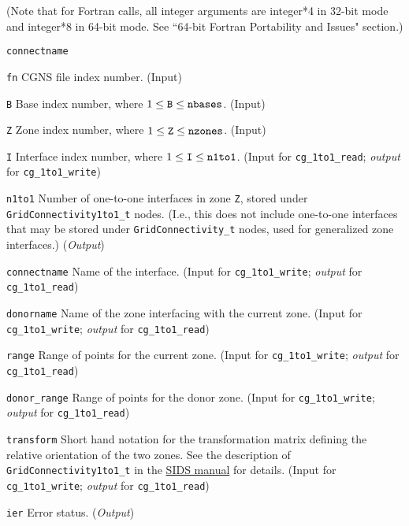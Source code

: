 \noindent (Note that for Fortran calls, all integer arguments are integer*4 in 32-bit mode and integer*8 in 64-bit mode.
See ``64-bit Fortran Portability and Issues" section.)

\begin{Ventryi}{\texttt{connectname}}\raggedright
\item [\texttt{fn}]
      CGNS file index number.
      (\textcolor{input}{Input})
\item [\texttt{B}]
      Base index number, where $1 \leq \text{\texttt{B}} \leq \text{\texttt{nbases}}$.
      (\textcolor{input}{Input})
\item [\texttt{Z}]
      Zone index number, where $1 \leq \text{\texttt{Z}} \leq \text{\texttt{nzones}}$.
      (\textcolor{input}{Input})
\item [\texttt{I}]
      Interface index number, where $1 \leq \text{\texttt{I}} \leq \text{\texttt{n1to1}}$.
      (\textcolor{input}{Input} for \texttt{cg\_1to1\_read};
      \textcolor{output}{\textit{output}} for \texttt{cg\_1to1\_write})
\item [\texttt{n1to1}]
      Number of one-to-one interfaces in zone \texttt{Z}, stored under
      \texttt{GridConnectivity1to1\_t} nodes.
      (I.e., this does not include one-to-one interfaces that may be
      stored under \texttt{GridConnectivity\_t} nodes, used for
      generalized zone interfaces.)
      (\textcolor{output}{\textit{Output}})
\item [\texttt{connectname}]
      Name of the interface.
      (\textcolor{input}{Input} for \texttt{cg\_1to1\_write};
      \textcolor{output}{\textit{output}} for \texttt{cg\_1to1\_read})
\item [\texttt{donorname}]
      Name of the zone interfacing with the current zone.
      (\textcolor{input}{Input} for \texttt{cg\_1to1\_write};
      \textcolor{output}{\textit{output}} for \texttt{cg\_1to1\_read})
\item [\texttt{range}]
      Range of points for the current zone.
      (\textcolor{input}{Input} for \texttt{cg\_1to1\_write};
      \textcolor{output}{\textit{output}} for \texttt{cg\_1to1\_read})
\item [\texttt{donor\_range}]
      Range of points for the donor zone.
      (\textcolor{input}{Input} for \texttt{cg\_1to1\_write};
      \textcolor{output}{\textit{output}} for \texttt{cg\_1to1\_read})
\item [\texttt{transform}]
      Short hand notation for the transformation matrix defining the
      relative orientation of the two zones.
      See the description of \texttt{GridConnectivity1to1\_t} in the
      \href{../sids/sids.pdf}{SIDS manual} for details.
      (\textcolor{input}{Input} for \texttt{cg\_1to1\_write};
      \textcolor{output}{\textit{output}} for \texttt{cg\_1to1\_read})
\item [\texttt{ier}]
      Error status.
      (\textcolor{output}{\textit{Output}})
\end{Ventryi}

